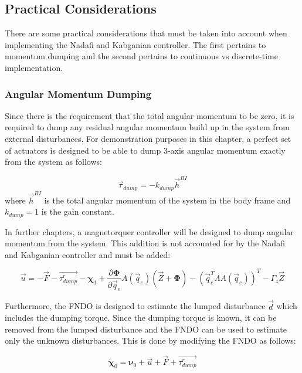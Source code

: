 \subsection{Practical Considerations}
There are some practical considerations that must be taken into account when implementing the Nadafi and Kabganian controller. The first pertains to momentum dumping and the second pertains to continuous vs discrete-time implementation.


\subsubsection*{Angular Momentum Dumping}

Since there is the requirement that the total angular momentum to be zero, it is required to dump any residual angular momentum build up in the system from external disturbances. For demonstration purposes in this chapter, a perfect set of actuators is designed to be able to dump 3-axis angular momentum exactly from the system as follows:

\begin{equation}
    \vec{\tau}_{dump} = -k_{dump} \vec{h}^{BI}
\end{equation}
where $\vec{h}^{BI}$ is the total angular momentum of the system in the body frame and $k_{dump} = 1$ is the gain constant. 


In further chapters, a magnetorquer controller will be designed to dump angular momentum from the system. This addition is not accounted for by the Nadafi and Kabganian controller and must be added:

\begin{equation}
    \vec{u} = -\vec{F} - \vec{\tau_{dump}^r} - \boldsymbol{\chi}_1 + \frac{\partial\boldsymbol{\Phi}}{\partial\vec{q}_e}A(\vec{q}_e)(\vec{Z} + \boldsymbol{\Phi})
    - \left(\vec{q}_e^T \Lambda A(\vec{q}_e)\right)^T - \Gamma_z \vec{Z} 
    \label{eq:fndo_bs_with_dump}
\end{equation}

Furthermore, the FNDO is designed to estimate the lumped disturbance $\vec{d}$ which includes the dumping torque. Since the dumping torque is known, it can be removed from the lumped disturbance and the FNDO can be used to estimate only the unknown disturbances. This is done by modifying the FNDO as follows:

\begin{equation}
    \dot{\boldsymbol{\chi}}_0 = \boldsymbol{\nu}_0 + \vec{u} + \vec{F} + \vec{\tau_{dump}^r}
    \label{eq:modified_fndo}
\end{equation}      

